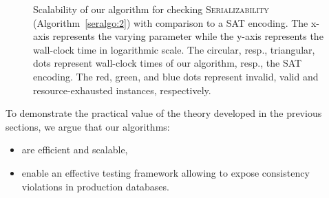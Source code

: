 \begin{figure}
 \vspace{-3mm}
 \caption{Scalability of our algorithm for checking \textsc{Serializability} (Algorithm~\ref{seralgo:2}) with comparison to a SAT encoding. The x-axis represents the varying parameter while the y-axis represents the wall-clock time in logarithmic scale. The circular, resp., triangular, dots represent wall-clock times of our algorithm, resp., the SAT encoding. The red, green, and blue dots represent invalid, valid and resource-exhausted instances, respectively.}
 \label{ser_performace_scale}
 \vspace{-3mm}
\end{figure}


To demonstrate the practical value of the theory developed in the previous sections, we argue that our algorithms:
\begin{itemize}
 \item are efficient and scalable, %
 \item enable an effective testing framework allowing to expose consistency violations in production databases.
\end{itemize}

